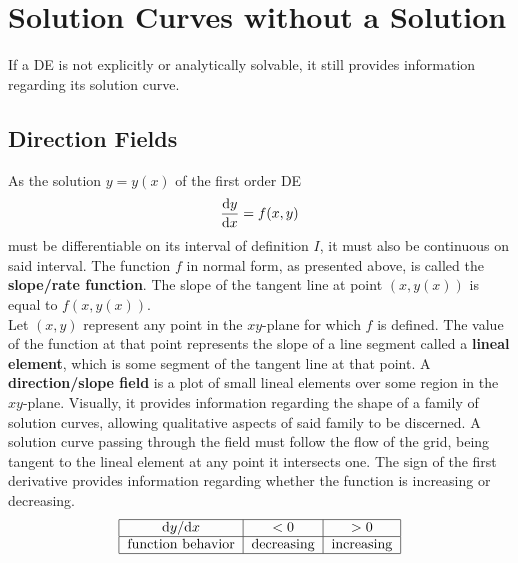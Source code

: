 \documentclass[./Differential Equations.tex]{subfiles}
\begin{document}
	\section{Solution Curves without a Solution}
		If a DE is not explicitly or analytically solvable, it still provides information regarding its solution curve.
		\subsection{Direction Fields}
				As the solution \(y = y(x)\) of the first order DE
					\[\dv{y}{x} = f(x, y)\]
					must be differentiable on its interval of definition \(I\), it must also be continuous on said interval. The function \(f\) in normal form, as presented above, is called the \textbf{slope/rate function}. The slope of the tangent line at point \((x, y(x))\) is equal to \(f(x, y(x))\). \\
				Let \((x, y)\) represent any point in the \(xy\)-plane for which \(f\) is defined. The value of the function at that point represents the slope of a line segment called a \textbf{lineal element}, which is some segment of the tangent line at that point.
				A \textbf{direction/slope field} is a plot of small lineal elements over some region in the \(xy\)-plane. Visually, it provides information regarding the shape of a family of solution curves, allowing qualitative aspects of said family to be discerned. A solution curve passing through the field must follow the flow of the grid, being tangent to the lineal element at any point it intersects one.
				The sign of the first derivative provides information regarding whether the function is increasing or decreasing.
					\[\begin{tabular}{|c|c|c|}\hline
						\(\dv*{y}{x}\) & \(< 0\) & \(> 0\) \\\hline
						function behavior & decreasing & increasing \\\hline
					\end{tabular}\]
\end{document}
